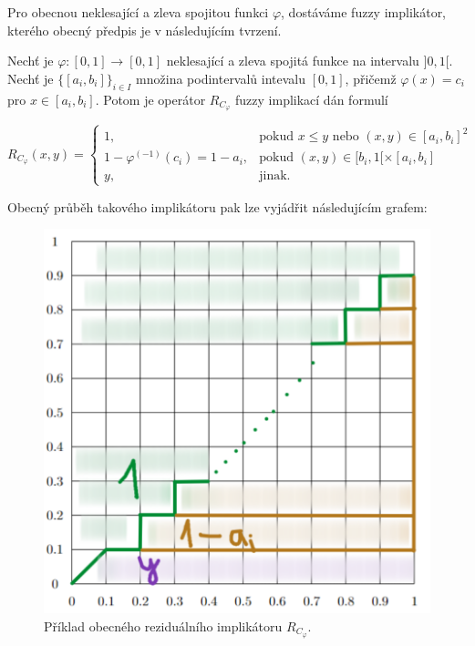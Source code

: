 Pro obecnou neklesající a zleva spojitou funkci $\varphi$,  dostáváme fuzzy implikátor, kterého obecný předpis je v následujícím tvrzení.
\begin{sentence}
\cite{mitav}
\label{r-impl}
     Nechť je $\varphi:[0,1]\rightarrow [0,1]$
neklesající a zleva spojitá funkce na intervalu $]0,1[$.
Nechť je
$\{[a_i,b_i]\}_{i\in I}$ množina podintervalů intevalu $[0,1]$, přičemž $\varphi(x)=c_i$ pro $x\in
[a_i,b_i]$.
Potom je operátor $R_{C_\varphi}$ fuzzy implikací dán formulí

$$ R_{C_\varphi}(x,y) = \begin{cases} 1, & \mbox{pokud } x\leq y \mbox{ nebo } (x,y) \in [a_i,b_i]^2\\
1-\varphi^{(-1)}(c_i)=1-a_i, &\mbox {pokud }
(x,y)\in [b_i,1[\times[a_i,b_i]
\\ y, &\mbox {jinak.}
\end{cases} $$
\end{sentence}

Obecný průběh takového implikátoru pak lze vyjádřit následujícím grafem:

\begin{figure}[H]
\caption{Příklad obecného reziduálního implikátoru $R_{C_\varphi}$.}
            \hspace{-1cm}
            \includegraphics[scale=0.5]{template-fig/r-impliphi.pdf}
            \centering
\end{figure}


